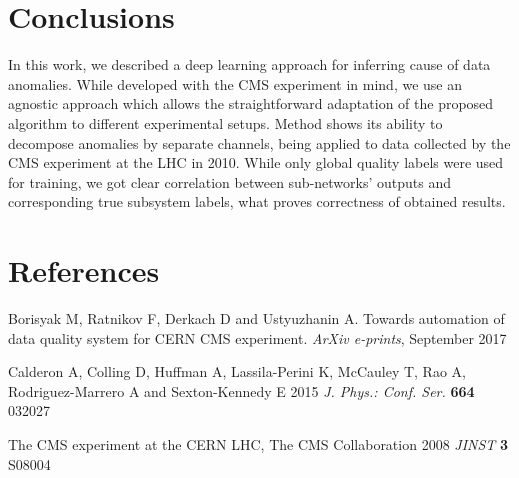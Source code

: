 \documentclass[a4paper]{jpconf}
\begin{document}
\section{Conclusions}
In this work, we described a deep learning approach for inferring cause of data anomalies. While developed
with the CMS experiment in mind, we use an agnostic approach which allows the straightforward
adaptation of the proposed algorithm to different experimental setups. Method shows its ability to decompose anomalies by separate channels, being applied to data collected by the CMS experiment at the LHC in 2010. While only global quality labels were used for training, we got clear correlation between sub-networks’ outputs and corresponding true subsystem labels, what proves correctness of obtained results.

\section*{References}
\begin{thebibliography}{3}
\item Borisyak M, Ratnikov F, Derkach D and Ustyuzhanin A. Towards automation of data quality system for CERN CMS experiment. {\it ArXiv e-prints}, September 2017

\item  Calderon A, Colling D, Huffman A, Lassila-Perini K, McCauley T, Rao A, Rodriguez-Marrero A and Sexton-Kennedy E 2015 {\it J. Phys.: Conf. Ser.} {\bf 664} 032027

\item The CMS experiment at the CERN LHC, The CMS Collaboration 2008 {\it JINST} {\bf 3} S08004
\end{thebibliography}
\end{document}
